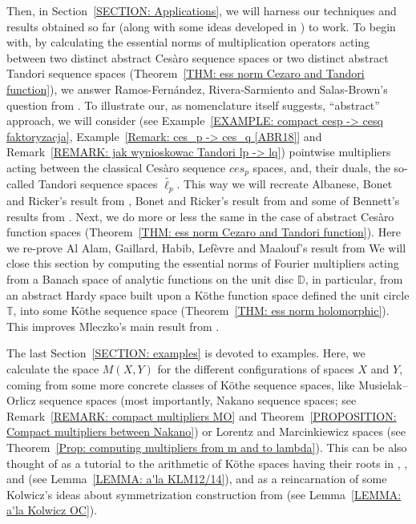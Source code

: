 \documentclass[11pt]{amsart}
\theoremstyle{definition}
\theoremstyle{definition}
\theoremstyle{definition}
\theoremstyle{definition}
\theoremstyle{definition}
\theoremstyle{definition}
\theoremstyle{definition}
\theoremstyle{definition}
\numberwithin{equation}{section}
\numberwithin{equation}{section}
\numberwithin{equation}{section}
\theoremstyle{definition}
\theoremstyle{definition}
\theoremstyle{definition}
\theoremstyle{definition}
\theoremstyle{definition}
\theoremstyle{definition}
\begin{document}
Then, in Section~\ref{SECTION: Applications}, we will harness our techniques and results obtained so far (along with some ideas developed in \cite{KT24}) to work.
To begin with, by calculating the essential norms of multiplication operators acting between two distinct abstract Ces{\` a}ro sequence spaces
or two distinct abstract Tandori sequence spaces (Theorem~\ref{THM: ess norm Cezaro and Tandori function}), we answer Ramos-Fern{\' a}ndez,
Rivera-Sarmiento and Salas-Brown's question from \cite{RFRSSB19}.
To illustrate our, as nomenclature itself suggests, \enquote{abstract} approach, we will consider (see Example~\ref{EXAMPLE: compact cesp -> cesq faktoryzacja},
Example~\ref{Remark: ces_p -> ces_q [ABR18]} and Remark~\ref{REMARK: jak wynioskowac Tandori lp -> lq}) pointwise multipliers acting between
the classical Ces{\` a}ro sequence $ces_p$ spaces, and, their duals, the so-called Tandori sequence spaces $\widetilde{\ell_p}$.
This way we will recreate Albanese, Bonet and Ricker's result from \cite{ABR18}, Bonet and Ricker's result from \cite{BR20} and some of Bennett's results from \cite{Ben96}.
Next, we do more or less the same in the case of abstract Ces{\` a}ro function spaces (Theorem~\ref{THM: ess norm Cezaro and Tandori function}).
Here we re-prove Al Alam, Gaillard, Habib, Lef{\` e}vre and Maalouf's result from \cite{AGHLM18}
We will close this section by computing the essential norms of Fourier multipliers acting from a Banach space of analytic functions on the unit disc
$\mathbb{D}$, in particular, from an abstract Hardy space built upon a K{\" o}the function space defined the unit circle $\mathbb{T}$, into some
K{\" o}the sequence space (Theorem~\ref{THM: ess norm holomorphic}). This improves Mleczko's main result from \cite{Mle09}.

The last Section~\ref{SECTION: examples} is devoted to examples. Here, we calculate the space $M(X,Y)$ for the different configurations of spaces $X$ and $Y$,
coming from some more concrete classes of K{\" o}the sequence spaces, like Musielak--Orlicz sequence spaces (most importantly, Nakano sequence spaces;
see Remark~\ref{REMARK: compact multipliers MO} and Theorem~\ref{PROPOSITION: Compact multipliers between Nakano})
or Lorentz and Marcinkiewicz spaces (see Theorem~\ref{Prop: computing multipliers from m and to lambda}).
This can be also thought of as a tutorial to the arithmetic of K{\" o}the spaces having their roots in \cite{KLM12}, \cite{KLM14}, \cite{KLM19} and \cite{Sch10}
(see Lemma~\ref{LEMMA: a'la KLM12/14}), and as a reincarnation of some Kolwicz's ideas about symmetrization construction from \cite{Kol16} (see Lemma~\ref{LEMMA: a'la Kolwicz OC}).
\end{document}
